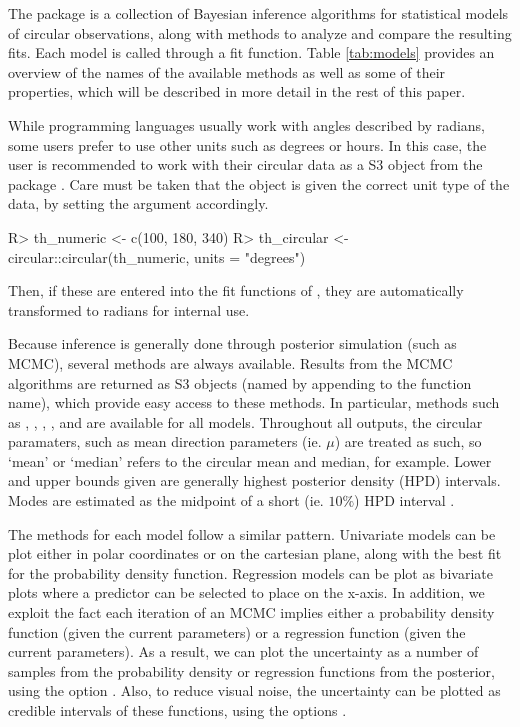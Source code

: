 \label{sec:pkgstruct}

The package  is a collection of Bayesian inference
algorithms for statistical models of circular observations, along with
methods to analyze and compare the resulting fits. Each model is called
through a fit function. Table \ref{tab:models} provides an overview of
the names of the available methods as well as some of their properties,
which will be described in more detail in the rest of this paper.

While programming languages usually work with angles described by
radians, some users prefer to use other units such as degrees or hours.
In this case, the user is recommended to work with their circular data
as a  S3 object from the package . Care
must be taken that the  object is given the correct unit
type of the data, by setting the  argument accordingly.

\begin{CodeChunk}

\begin{CodeInput}
R> th_numeric  <- c(100, 180, 340)
R> th_circular <- circular::circular(th_numeric, units = "degrees")
\end{CodeInput}
\end{CodeChunk}

Then, if these are entered into the fit functions of ,
they are automatically transformed to radians for internal use.

Because inference is generally done through posterior simulation (such
as MCMC), several methods are always available. Results from the MCMC
algorithms are returned as S3 objects (named by appending  to
the function name), which provide easy access to these methods. In
particular, methods such as , ,
, ,  and 
are available for all models. Throughout all outputs, the circular
paramaters, such as mean direction parameters (ie. \(\mu\)) are treated
as such, so `mean' or `median' refers to the circular mean and median,
for example. Lower and upper bounds given are generally highest
posterior density (HPD) intervals. Modes are estimated as the midpoint
of a short (ie. \(10\%\)) HPD interval \citep{venter1967estimation}.

The  methods for each model follow a similar pattern.
Univariate models can be plot either in polar coordinates or on the
cartesian plane, along with the best fit for the probability density
function. Regression models can be plot as bivariate plots where a
predictor can be selected to place on the x-axis. In addition, we
exploit the fact each iteration of an MCMC implies either a probability
density function (given the current parameters) or a regression function
(given the current parameters). As a result, we can plot the uncertainty
as a number of samples from the probability density or regression
functions from the posterior, using the option . Also,
to reduce visual noise, the uncertainty can be plotted as credible
intervals of these functions, using the options .

